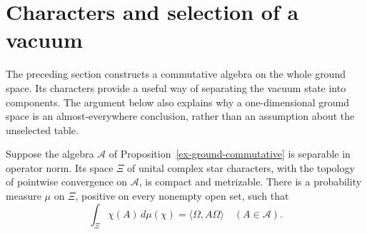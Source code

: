 \section{Characters and selection of a vacuum}
\label{ex-phase-selection}

The preceding section constructs a commutative algebra on the whole ground
space. Its characters provide a useful way of separating the vacuum state
into components. The argument below also explains why a one-dimensional
ground space is an almost-everywhere conclusion, rather than an assumption
about the unselected table.

\begin{proposition}\label{ex-character-measure}
Suppose the algebra \(\mathcal A\) of
Proposition~\ref{ex-ground-commutative} is separable in operator norm.
Its space \(\Xi\) of unital complex star characters, with the topology
of pointwise convergence on \(\mathcal A\), is compact and metrizable.
There is a probability measure \(\mu\) on \(\Xi\), positive on every
nonempty open set, such that
\begin{equation}\label{ex-spectral-state}
 \int_\Xi\chi(A)\,d\mu(\chi)=\langle\Omega,A\Omega\rangle
 \quad(A\in\mathcal A).
\end{equation}
\end{proposition}

